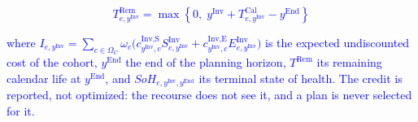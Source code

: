 \textcolor{blue}{
    \begin{equation}
        T^\text{Rem}_{e,y^\text{Inv}} = \max\left\{0,\; y^\text{Inv} + T^\text{Cal}_{e,y^\text{Inv}} - y^\text{End}\right\}
        \label{eq:salvage_remaining_life}
    \end{equation}
}

\noindent
\textcolor{blue}{where $I_{e,y^\text{Inv}} = \sum_{c \in \Omega_C} \omega_c \big( c^{\text{Inv,S}}_{y^\text{Inv},c}
S^{\text{Inv}}_{e,y^\text{Inv}} + c^{\text{Inv,E}}_{y^\text{Inv},c} E^{\text{Inv}}_{e,y^\text{Inv}} \big)$ is the
expected undiscounted cost of the cohort, $y^\text{End}$ the end of the planning horizon, $T^\text{Rem}$ its
remaining calendar life at $y^\text{End}$, and $SoH_{e,y^\text{Inv},y^\text{End}}$ its terminal state of health.
The credit is reported, not optimized: the recourse does not see it, and a plan is never selected for it.}
